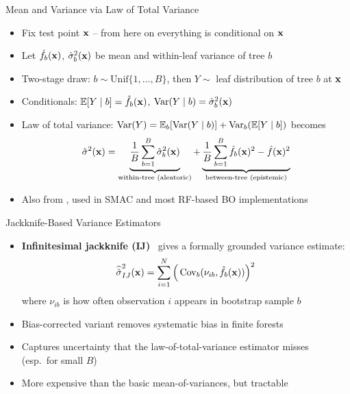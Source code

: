 \documentclass[main]{subfiles}
\begin{document}
\begin{frame}[t]{Mean and Variance via Law of Total Variance}
  \begin{itemize}
    \item Fix test point $\mathbf{x}$ -- from here on everything is conditional on $\mathbf{x}$ 
    \item Let $\hat{f}_b(\mathbf{x})$, $\hat{\sigma}_b^2(\mathbf{x})$ be mean and within-leaf variance of tree $b$
    \item Two-stage draw: $b \sim \text{Unif}\{1,\ldots,B\}$, then $Y \sim$ leaf distribution of tree $b$ at $\mathbf{x}$
    \item Conditionals: $\operatorname*{\mathbb{E}}[Y \mid b] = \hat{f}_b(\mathbf{x})$, $\operatorname{Var}(Y \mid b) = \hat{\sigma}_b^2(\mathbf{x})$
    \item Law of total variance: $\operatorname{Var}(Y) = \operatorname*{\mathbb{E}}_b[\operatorname{Var}(Y \mid b)] + \operatorname{Var}_b(\operatorname*{\mathbb{E}}[Y \mid b])$ becomes
    $$
    \hat{\sigma}^2(\mathbf{x}) = \underbrace{\frac{1}{B} \sum_{b=1}^B \hat{\sigma}_b^2(\mathbf{x})}_{\text{within-tree (aleatoric)}}
      + \underbrace{\frac{1}{B} \sum_{b=1}^B \hat{f}_b(\mathbf{x})^2 - \hat{f}(\mathbf{x})^2}_{\text{between-tree (epistemic)}}
    $$
    \item Also from , used in SMAC and most RF-based BO implementations
  \end{itemize}
\end{frame}


\begin{frame}[t]{Jackknife-Based Variance Estimators}
  \begin{itemize}
    \item \textbf{Infinitesimal jackknife (IJ)}~ gives a formally grounded variance estimate:
        $$\widehat{\hat{\sigma}}^2_{IJ}(\mathbf{x}) = \sum_{i=1}^N \Big(\operatorname{Cov}_b(\nu_{ib}, \hat{f}_b(\mathbf{x}))\Big)^2$$
        where $\nu_{ib}$ is how often observation $i$ appears in bootstrap sample $b$
    \item Bias-corrected variant removes systematic bias in finite forests
    \item Captures uncertainty that the law-of-total-variance estimator misses\\
    (esp.\ for small $B$)
    \item More expensive than the basic mean-of-variances, but tractable
  \end{itemize}
\end{frame}
\end{document}
